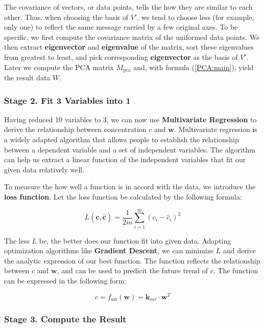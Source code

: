 \documentclass[12pt]{article}
\begin{document}
The covariance of vectors, or data points, tells the how they are similar to each other. Thus, when choosing the basis of $V'$, we tend to choose less (for example, only one) to reflect the same message carried by a few original axes. To be specific, we first compute the covariance matrix of the uniformed data points. We then extract \textbf{eigenvector} and \textbf{eigenvalue} of the matrix, sort these eigenvalues from greatest to least, and pick corresponding \textbf{eigenvector} as the basis of $V'$. Later we compute the PCA matrix $M_{\text{pca}}$ and, with formula (\ref{PCA:main}), yield the result data $W$.

\subsubsection{Stage 2. Fit 3 Variables into 1}
\label{m1:sec:mr}

Having reduced 10 variables to 3, we can now use \textbf{Multivariate Regression} to derive the relationship between  concentration $c$ and $\boldsymbol{w}$. Multivariate regression is a widely adapted algorithm that allows people to establish the relationship between a dependent variable and a set of independent variables. The algorithm can help us extract a linear function of the independent variables that fit our given data relatively well. 

To measure the how well a function is in accord with the data, we introduce the \textbf{loss function}. Let the loss function be calculated by the following formula:

\begin{equation}
    L(\boldsymbol{c}, \hat{\boldsymbol{c}}) = \frac 1 {2m} \sum\limits_{i=1}^m
    (c_i - \hat c_i)^2
\end{equation}

The less $L$ be, the better does our function fit into given data. Adapting optimization algorithms like \textbf{Gradient Descent}, we can minimize $L$ and derive the analytic expression of our best function. The function reflects the relationship between $c$ and $\boldsymbol{w}$, and can be used to predicit the future trend of $c$. The function can be expressed in the following form:

\begin{equation}
    \label{MR:main}
    c = f_{\text{mr}} (\boldsymbol{w}) = \boldsymbol{k}_{mr} \cdot \boldsymbol{w}^T
\end{equation}

\subsubsection{Stage 3. Compute the Result}
\end{document}
